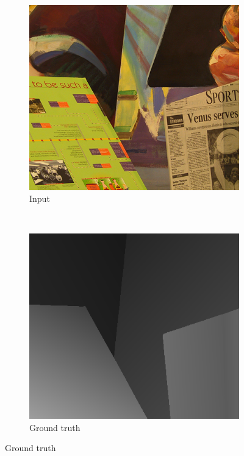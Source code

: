 \begin{figure}
  \setcounter{subfigure}{0}
  \label{fig:grid-of-outputs-venus}
  \centering

  \begin{subfigure}[b]{0.3\textwidth}
    \centering
    \includegraphics[width=\textwidth]{images/stereo-pairs/venus_imL.png}
    \caption{Input}
  \end{subfigure}
  ~
  \begin{subfigure}[b]{0.3\textwidth}
    \centering
    \includegraphics[width=\textwidth]{images/stereo-pairs/venus_groundtruth.png}
    \caption{Ground truth}
  \end{subfigure}


\end{figure}
